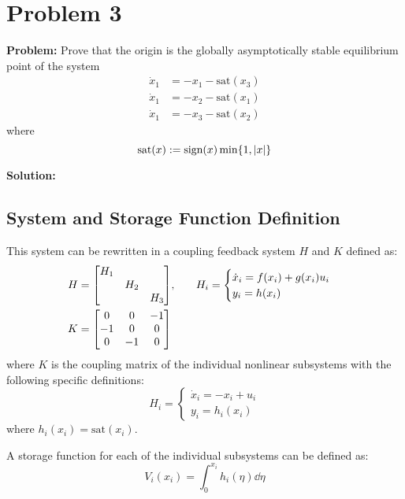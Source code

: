 \documentclass[letter]{article}
\numberwithin{equation}{section}
\newcommand{\sat}{\text{sat}}
\newcommand{\sign}{\text{sign}}
\begin{document}
\section{Problem 3}
\textbf{Problem:}
Prove that the origin is the globally asymptotically stable equilibrium point of the system
\begin{equation}
	\begin{aligned}
		\dot{x}_1 &= -x_1 - \sat(x_3)\\
		\dot{x}_1 &= -x_2 - \sat(x_1)\\
		\dot{x}_1 &= -x_3 - \sat(x_2)
	\end{aligned}
\end{equation}
where
\begin{equation}
	\sat(x) := \sign(x) \min\{1,\abs{x}\}
\end{equation}

\noindent
\textbf{Solution:}
\subsection{System and Storage Function Definition}
This system can be rewritten in a coupling feedback system $H$ and $K$ defined as:
\begin{align}
	H &= \mqty[\dmat{H_1}{H_2}{H_3}], \hspace{0.25in}
	H_i
	=\begin{cases}
		\dot{x}_i = f(x_i) + g(x_i) u_i\\
		y_i = h(x_i)
	\end{cases}\\
	K &= \mqty[	 0 	& 0 &-1\\
	-1 	& 0 & 0\\
	0 	&-1 & 0]
\end{align}
where $K$ is the coupling matrix of the individual nonlinear subsystems with the following specific definitions:
\begin{equation}
	H_i =
	\begin{cases}
		\dot{x}_i = -x_i + u_i\\
		y_i = h_i(x_i)
	\end{cases}
\end{equation}
where $h_i(x_i) = \sat(x_i)$.

A storage function for each of the individual subsystems can be defined as:
\begin{equation}
	V_i(x_i) = \int_{0}^{x_i} h_i(\eta) \dd \eta
\end{equation}
\end{document}
